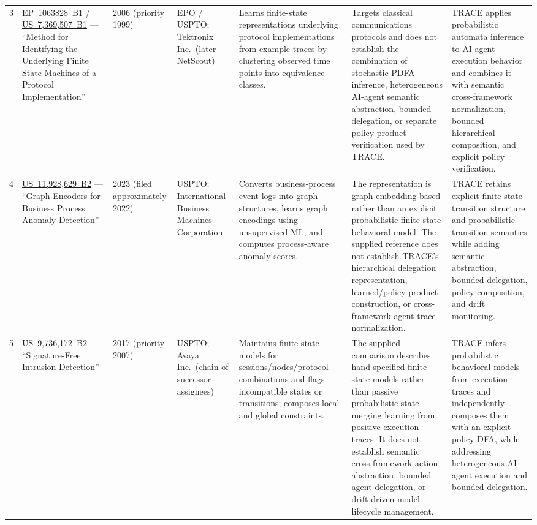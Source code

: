 \documentclass[11pt,a4paper]{article}
\begin{document}
\begin{landscape}
\begin{longtable}{C{0.7cm} L{3.3cm} C{1.3cm} L{2.5cm} L{4.2cm} L{4.2cm} L{4.2cm}}
\addlinespace

3 &
\href{https://patents.google.com/patent/EP1063828A3/en}
{EP~1063828~B1 / US~7,369,507~B1} --- ``Method for Identifying the Underlying Finite State
Machines of a Protocol Implementation'' &
2006 (priority 1999) &
EPO / USPTO; Tektronix Inc.\ (later NetScout) &
Learns finite-state representations underlying protocol implementations from example
traces by clustering observed time points into equivalence classes. &
Targets classical communications protocols and does not establish the combination of
stochastic PDFA inference, heterogeneous AI-agent semantic abstraction, bounded
delegation, or separate policy-product verification used by TRACE. &
TRACE applies probabilistic automata inference to AI-agent execution behavior and combines
it with semantic cross-framework normalization, bounded hierarchical composition, and
explicit policy verification. \\

\addlinespace

4 &
\href{https://patents.google.com/patent/US11928629B2/en}
{US~11,928,629~B2} --- ``Graph Encoders for Business Process Anomaly Detection'' &
2023 (filed approximately 2022) &
USPTO; International Business Machines Corporation &
Converts business-process event logs into graph structures, learns graph encodings using
unsupervised ML, and computes process-aware anomaly scores. &
The representation is graph-embedding based rather than an explicit probabilistic
finite-state behavioral model. The supplied reference does not establish TRACE's
hierarchical delegation representation, learned/policy product construction, or
cross-framework agent-trace normalization. &
TRACE retains explicit finite-state transition structure and probabilistic transition
semantics while adding semantic abstraction, bounded delegation, policy composition, and
drift monitoring. \\

\addlinespace

5 &
\href{https://patents.google.com/patent/US9736172}
{US~9,736,172~B2} --- ``Signature-Free Intrusion Detection'' &
2017 (priority 2007) &
USPTO; Avaya Inc.\ (chain of successor assignees) &
Maintains finite-state models for sessions/nodes/protocol combinations and flags
incompatible states or transitions; composes local and global constraints. &
The supplied comparison describes hand-specified finite-state models rather than passive
probabilistic state-merging learning from positive execution traces. It does not establish
semantic cross-framework action abstraction, bounded agent delegation, or drift-driven
model lifecycle management. &
TRACE infers probabilistic behavioral models from execution traces and independently
composes them with an explicit policy DFA, while addressing heterogeneous AI-agent
execution and bounded delegation. \\

\end{longtable}
\end{landscape}
\end{document}
